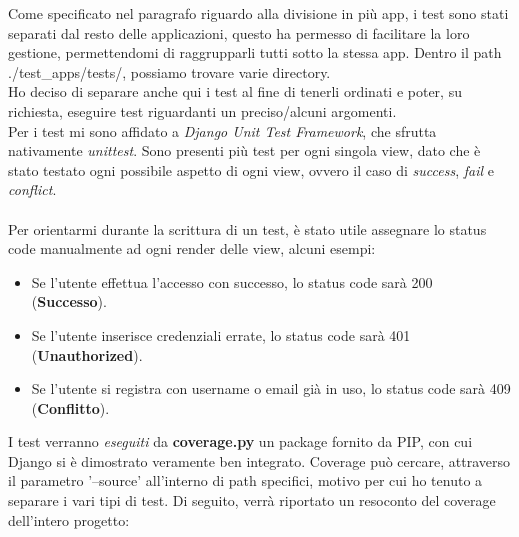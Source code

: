 \documentclass[12pt]{article}
\begin{document}
	\pagebreak
	
	
	
	\noindent Come specificato nel paragrafo riguardo alla divisione in più app, i test sono stati separati dal resto delle applicazioni, questo ha permesso di facilitare la loro gestione, permettendomi di raggrupparli tutti sotto la stessa app. Dentro il path ./test\_apps/tests/, possiamo trovare varie directory. \\Ho deciso di separare anche qui i test al fine di tenerli ordinati e poter, su richiesta, eseguire test riguardanti un preciso/alcuni argomenti. \\
	Per i test mi sono affidato a \textit{Django Unit Test Framework}, che sfrutta nativamente \textit{unittest}.
	Sono presenti più test per ogni singola view, dato che è stato testato ogni possibile aspetto di ogni view, ovvero il caso di \textit{success}, \textit{fail} e \textit{conflict}. \\ \\
	Per orientarmi durante la scrittura di un test, è stato utile assegnare lo status code manualmente ad ogni render delle view, alcuni esempi:
	\begin{itemize}
		\item Se l'utente effettua l'accesso con successo, lo status code sarà 200 (\textbf{Successo}).
		\item Se l'utente inserisce credenziali errate, lo status code sarà 401 (\textbf{Unauthorized}).
		\item Se l'utente si registra con username o email già in uso, lo status code sarà 409 (\textbf{Conflitto}).
	\end{itemize}

	\noindent I test verranno \textit{eseguiti} da \textbf{coverage.py} un package fornito da PIP, con cui Django si è dimostrato veramente ben integrato. Coverage può cercare, attraverso il parametro '--source' all'interno di path specifici, motivo per cui ho tenuto a separare i vari tipi di test. Di seguito, verrà riportato un resoconto del coverage dell'intero progetto:
	
\end{document}
